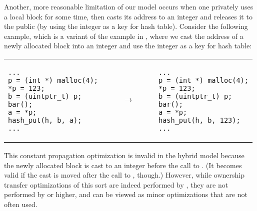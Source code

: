 Another, more reasonable limitation of our model occurs when one privately uses a local block for some time, then casts its address to an integer and releases it to the
public (\eg by using the integer as a key for hash table).  Consider the following example, which is a variant of the example in ,
where we cast the address of a newly allocated block into an integer
and use the integer as a key for hash table:

\vskip 0.2cm

\begin{center}
\small
\begin{tabular}{@{}l@{}l@{}l@{}}
\begin{minipage}{0.3\textwidth}
\begin{verbatim}
...
p = (int *) malloc(4);
*p = 123;
b = (uintptr_t) p;
bar();
a = *p;
hash_put(h, b, a);
...
\end{verbatim}
\end{minipage}
&
$\qquad\rightarrow\qquad$
&
\begin{minipage}{0.3\textwidth}
\begin{verbatim}
...
p = (int *) malloc(4);
*p = 123;
b = (uintptr_t) p;
bar();
a = *p;
hash_put(h, b, 123);
...
\end{verbatim}
\end{minipage}
\\
\end{tabular}
\end{center}

This constant propagation optimization is invalid in the
hybrid model because the newly allocated block is cast to an
integer before the call to .  (It becomes valid if the
cast is moved after the call to , though.)  However, while
ownership transfer optimizations of this sort are indeed performed by
, they are not performed by  or
higher, and can be viewed as minor optimizations that are not often
used.






